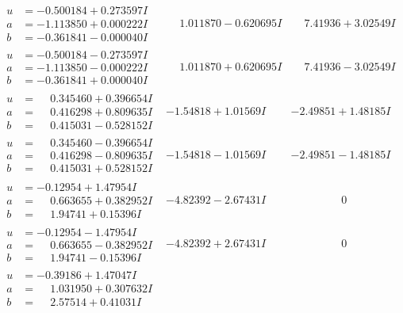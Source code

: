 \documentclass[1p]{elsarticle_modified}
\theoremstyle{definition}
\begin{document}
$$\begin{array}{c|c|c}
\begin{aligned}
u &= -0.500184 + 0.273597 I \\
a &= -1.113850 + 0.000222 I \\
b &= -0.361841 - 0.000040 I\end{aligned}
 & \phantom{-}1.011870 - 0.620695 I & \phantom{-}7.41936 + 3.02549 I \\ \hline\begin{aligned}
u &= -0.500184 - 0.273597 I \\
a &= -1.113850 - 0.000222 I \\
b &= -0.361841 + 0.000040 I\end{aligned}
 & \phantom{-}1.011870 + 0.620695 I & \phantom{-}7.41936 - 3.02549 I \\ \hline\begin{aligned}
u &= \phantom{-}0.345460 + 0.396654 I \\
a &= \phantom{-}0.416298 + 0.809635 I \\
b &= \phantom{-}0.415031 - 0.528152 I\end{aligned}
 & -1.54818 + 1.01569 I & -2.49851 + 1.48185 I \\ \hline\begin{aligned}
u &= \phantom{-}0.345460 - 0.396654 I \\
a &= \phantom{-}0.416298 - 0.809635 I \\
b &= \phantom{-}0.415031 + 0.528152 I\end{aligned}
 & -1.54818 - 1.01569 I & -2.49851 - 1.48185 I \\ \hline\begin{aligned}
u &= -0.12954 + 1.47954 I \\
a &= \phantom{-}0.663655 + 0.382952 I \\
b &= \phantom{-}1.94741 + 0.15396 I\end{aligned}
 & -4.82392 - 2.67431 I & \phantom{-0.000000 } 0 \\ \hline\begin{aligned}
u &= -0.12954 - 1.47954 I \\
a &= \phantom{-}0.663655 - 0.382952 I \\
b &= \phantom{-}1.94741 - 0.15396 I\end{aligned}
 & -4.82392 + 2.67431 I & \phantom{-0.000000 } 0 \\ \hline\begin{aligned}
u &= -0.39186 + 1.47047 I \\
a &= \phantom{-}1.031950 + 0.307632 I \\
b &= \phantom{-}2.57514 + 0.41031 I\end{aligned}

\end{array}$$
\end{document}
